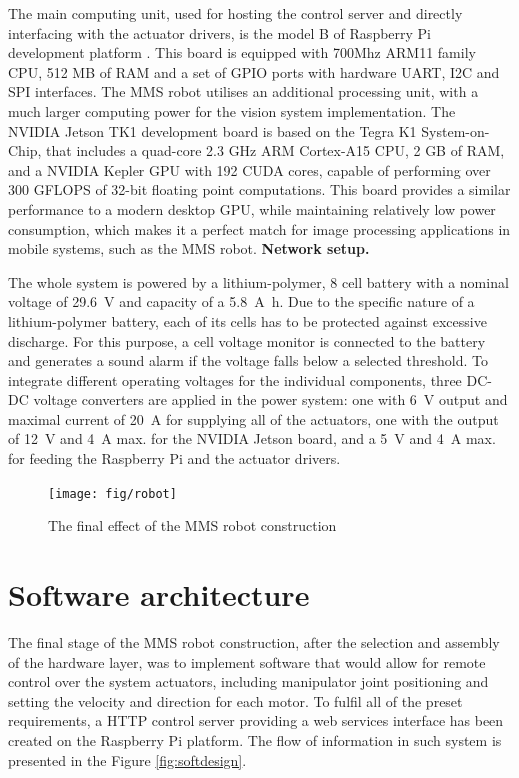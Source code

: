 The main computing unit, used for hosting the control server and directly interfacing with the actuator drivers, is the model B of Raspberry Pi development platform \cite{wikipedia}. This board is equipped with 700Mhz ARM11 family CPU, 512 MB of RAM and a set of GPIO ports with hardware UART, I2C and SPI interfaces. The MMS robot utilises an additional processing unit, with a much larger computing power for the vision system implementation. The NVIDIA Jetson TK1 \cite{nvidia} development board is based on the Tegra K1 System-on-Chip, that includes a quad-core 2.3 GHz ARM Cortex-A15 CPU, 2 GB of RAM, and a NVIDIA Kepler GPU with 192 CUDA cores, capable of performing over 300 GFLOPS of 32-bit floating point computations. This board provides a similar performance to a modern desktop GPU, while maintaining relatively low power consumption, which makes it a perfect match for image processing applications in mobile systems, such as the MMS robot. \textbf{Network setup.}

The whole system is powered by a lithium-polymer, 8 cell battery with a nominal voltage of \SI{29.6}{\volt} and capacity of a \SI{5.8}{\ampere\hour}. Due to the specific nature of a lithium-polymer battery, each of its cells has to be protected against excessive discharge. For this purpose, a cell voltage monitor is connected to the battery and generates a sound alarm if the voltage falls below a selected threshold. To integrate different operating voltages for the individual components, three DC-DC voltage converters are applied in the power system: one with \SI{6}{\volt} output and maximal current of \SI{20}{\ampere} for supplying all of the actuators, one with the output of \SI{12}{\volt} and \SI{4}{\ampere} max. for the NVIDIA Jetson board, and a \SI{5}{\volt} and \SI{4}{\ampere} max. for feeding the Raspberry Pi and the actuator drivers.

\begin{figure}[H]
\centering
\texttt{[image: fig/robot]}
\caption{The final effect of the MMS robot construction}
\label{fig:assembled}
\end{figure}

\section{Software architecture}
\label{sec:soft}

The final stage of the MMS robot construction, after the selection and assembly of the hardware layer, was to implement software that would allow for remote control over the system actuators, including manipulator joint positioning and setting the velocity and direction for each motor. To fulfil all of the preset requirements, a HTTP control server providing a web services interface has been created on the Raspberry Pi platform. The flow of information in such system is presented in the Figure \ref{fig:softdesign}.

